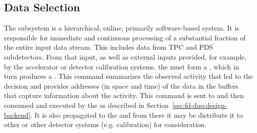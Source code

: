 \subsection{Data Selection}
\label{sec:sp-daq:design-selection-algs}







The  subsystem is a hierarchical, online, primarily
software-based system. It is responsible for immediate and continuous processing of a substantial fraction of the entire input data stream. 
This includes data from TPC and PDS subdetectors.
From that input, as well as external inputs provided, for example, by
the accelerator or detector calibration systems, the  must form a ,
which in turn produces a .
This command summarizes the observed activity that led to the decision
and provides addresses (in space and time) of the data in the  buffers that capture information about the activity.
This command is sent to and then consumed and executed by the  as described in Section~\ref{sec:fd-daq:design-backend}. 
It is also propagated to the  and from there it may be
distribute it to other  or other detector systems
(e.g. calibration) for consideration.

